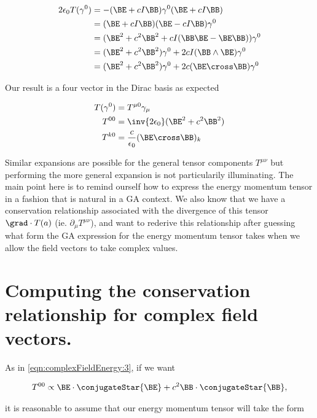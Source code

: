 \begin{align*}
2 \epsilon_0 T(\gamma^0) 
&= -(\BE + c I \BB) \gamma^0 (\BE + c I \BB) \\
&= (\BE + c I \BB) (\BE - c I \BB) \gamma^0 \\
&= (\BE^2 + c^2 \BB^2 + c I (\BB \BE - \BE \BB)) \gamma^0 \\
&= (\BE^2 + c^2 \BB^2) \gamma^0 + 2 c I ( \BB \wedge \BE ) \gamma^0 \\
&= (\BE^2 + c^2 \BB^2) \gamma^0 + 2 c ( \BE \cross \BB ) \gamma^0 \\
\end{align*}

Our result is a four vector in the Dirac basis as expected

\begin{subequations}
\begin{align}\label{eqn:complexFieldEnergy:7}
T(\gamma^0) &= T^{\mu 0} \gamma_\mu \\
T^{0 0} &= \inv{2 \epsilon_0} (\BE^2 + c^2 \BB^2) \\
T^{k 0} &= \frac{c}{\epsilon_0} (\BE \cross \BB)_k 
\end{align}
\end{subequations}

Similar expansions are possible for the general tensor components $T^{\mu\nu}$ but performing the more general expansion is not particularily illuminating.  The main point here is to remind ourself how to express the energy momentum tensor in a fashion that is natural in a GA context.  We also know that we have a conservation relationship associated with the divergence of this tensor $\grad \cdot T(a)$ (ie. $\partial_\mu T^{\mu\nu}$), and want to rederive this relationship after guessing what form the GA expression for the energy momentum tensor takes when we allow the field vectors to take complex values.

\section{Computing the conservation relationship for complex field vectors.}

As in \ref{eqn:complexFieldEnergy:3}, if we want 

\begin{align}\label{eqn:complexFieldEnergy:8}
T^{0 0} \propto \BE \cdot \conjugateStar{\BE} + c^2 \BB \cdot \conjugateStar{\BB},
\end{align}

it is reasonable to assume that our energy momentum tensor will take the form

